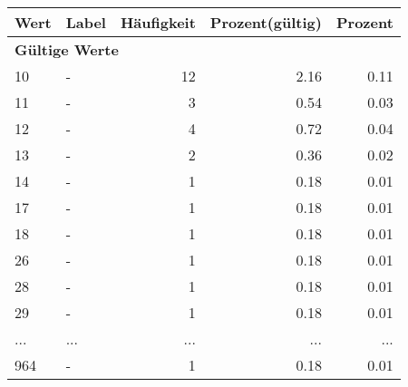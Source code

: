      \begin{longtable}{lXrrr}
     \toprule
     \textbf{Wert} & \textbf{Label} & \textbf{Häufigkeit} & \textbf{Prozent(gültig)} & \textbf{Prozent} \\
     \endhead
     \midrule
     \multicolumn{5}{l}{\textbf{Gültige Werte}}\\
        10 & \multicolumn{1}{X}{-} & %
          \num{12} &
          \num[round-mode=places,round-precision=2]{2,16} &
          \num[round-mode=places,round-precision=2]{0,11} \\
        11 & \multicolumn{1}{X}{-} & %
          \num{3} &
          \num[round-mode=places,round-precision=2]{0,54} &
          \num[round-mode=places,round-precision=2]{0,03} \\
        12 & \multicolumn{1}{X}{-} & %
          \num{4} &
          \num[round-mode=places,round-precision=2]{0,72} &
          \num[round-mode=places,round-precision=2]{0,04} \\
        13 & \multicolumn{1}{X}{-} & %
          \num{2} &
          \num[round-mode=places,round-precision=2]{0,36} &
          \num[round-mode=places,round-precision=2]{0,02} \\
        14 & \multicolumn{1}{X}{-} & %
          \num{1} &
          \num[round-mode=places,round-precision=2]{0,18} &
          \num[round-mode=places,round-precision=2]{0,01} \\
        17 & \multicolumn{1}{X}{-} & %
          \num{1} &
          \num[round-mode=places,round-precision=2]{0,18} &
          \num[round-mode=places,round-precision=2]{0,01} \\
        18 & \multicolumn{1}{X}{-} & %
          \num{1} &
          \num[round-mode=places,round-precision=2]{0,18} &
          \num[round-mode=places,round-precision=2]{0,01} \\
        26 & \multicolumn{1}{X}{-} & %
          \num{1} &
          \num[round-mode=places,round-precision=2]{0,18} &
          \num[round-mode=places,round-precision=2]{0,01} \\
        28 & \multicolumn{1}{X}{-} & %
          \num{1} &
          \num[round-mode=places,round-precision=2]{0,18} &
          \num[round-mode=places,round-precision=2]{0,01} \\
        29 & \multicolumn{1}{X}{-} & %
          \num{1} &
          \num[round-mode=places,round-precision=2]{0,18} &
          \num[round-mode=places,round-precision=2]{0,01} \\
       ... & ... & ... & ... & ... \\
        964 & \multicolumn{1}{X}{-} & %
          \num{1} &
          \num[round-mode=places,round-precision=2]{0,18} &
          \num[round-mode=places,round-precision=2]{0,01} \\


\end{longtable}
